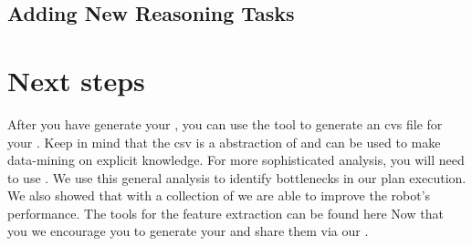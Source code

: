 \subsection{Adding New Reasoning Tasks}



\section{Next steps}
After you have generate your \neem, you can use the tool  to generate an cvs file for your \neem.
Keep in mind that the csv is a abstraction of \neemnar and can be used to make data-mining on explicit knowledge.
For more sophisticated analysis, you will need to use \knowrob. 
We use this general analysis to identify bottlenecks in our plan execution.
We also showed that with a collection of \neems we are able to improve the robot's performance.
The tools for the feature extraction can be found here 
Now that you we encourage you to generate your \neems and share them via our \neemhub.
